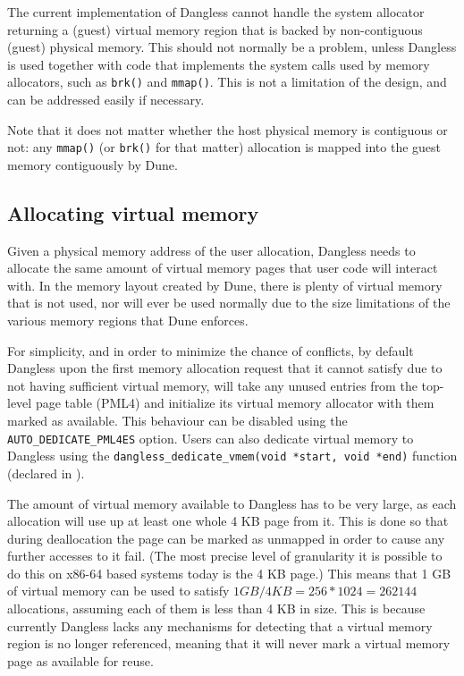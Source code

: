 The current implementation of Dangless cannot handle the system allocator returning a (guest) virtual memory region that is backed by non-contiguous (guest) physical memory. This should not normally be a problem, unless Dangless is used together with code that implements the system calls used by memory allocators, such as \lstinline!brk()! and \lstinline!mmap()!. This is not a limitation of the design, and can be addressed easily if necessary.

Note that it does not matter whether the host physical memory is contiguous or not: any \lstinline!mmap()! (or \lstinline!brk()! for that matter) allocation is mapped into the guest memory contiguously by Dune.

\subsection{Allocating virtual memory}
\label{sec:dangless-alloc-virtmem}

Given a physical memory address of the user allocation, Dangless needs to allocate the same amount of virtual memory pages that user code will interact with. In the memory layout created by Dune, there is plenty of virtual memory that is not used, nor will ever be used normally due to the size limitations of the various memory regions that Dune enforces.

For simplicity, and in order to minimize the chance of conflicts, by default Dangless upon the first memory allocation request that it cannot satisfy due to not having sufficient virtual memory, will take any unused entries from the top-level page table (PML4)  and initialize its virtual memory allocator with them marked as available. This behaviour can be disabled using the \lstinline!AUTO_DEDICATE_PML4ES! option. Users can also dedicate virtual memory to Dangless using the \lstinline!dangless_dedicate_vmem(void *start, void *end)! function (declared in ).

The amount of virtual memory available to Dangless has to be very large, as each allocation will use up at least one whole 4 KB page from it. This is done so that during deallocation the page can be marked as unmapped in order to cause any further accesses to it fail. (The most precise level of granularity it is possible to do this on x86-64 based systems today is the 4 KB page.) This means that 1 GB of virtual memory can be used to satisfy $1 GB / 4 KB = 256 * 1024 = 262 144$ allocations, assuming each of them is less than 4 KB in size. This is because currently Dangless lacks any mechanisms for detecting that a virtual memory region is no longer referenced, meaning that it will never mark a virtual memory page as available for reuse.

